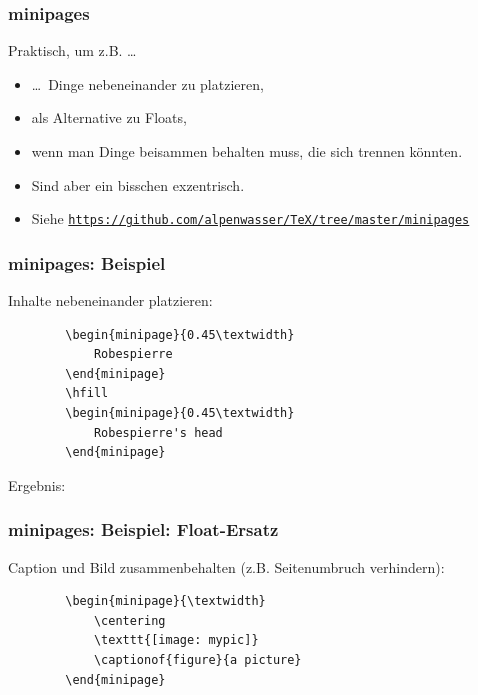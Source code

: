 \documentclass{beamer}                %
\begin{document}
\begin{frame} %
    \frametitle{minipages}

    Praktisch, um z.B. \ldots
    \begin{itemize}
        \item
            \ldots\ Dinge nebeneinander zu platzieren,
        \item
            als Alternative zu Floats,
        \item
            wenn man Dinge beisammen behalten muss, die sich trennen k\"onnten.
        \item
            Sind aber ein bisschen exzentrisch.
        \item
            Siehe
            \href{https://github.com/alpenwasser/TeX/tree/master/minipages}
                 {\nolinkurl{https://github.com/alpenwasser/TeX/tree/master/minipages}}
    \end{itemize}
\end{frame}
\begin{frame}[fragile] %
    \frametitle{minipages: Beispiel}

    Inhalte nebeneinander platzieren:

    \begin{verbatim}
        \begin{minipage}{0.45\textwidth}
            Robespierre
        \end{minipage}
        \hfill
        \begin{minipage}{0.45\textwidth}
            Robespierre's head
        \end{minipage}
    \end{verbatim}

    Ergebnis:

    \hfill
\end{frame}
\begin{frame}[fragile] %
    \frametitle{minipages: Beispiel: Float-Ersatz}

    Caption und Bild zusammenbehalten (z.B. Seitenumbruch verhindern):

    \begin{verbatim}
        \begin{minipage}{\textwidth}
            \centering
            \texttt{[image: mypic]}
            \captionof{figure}{a picture}
        \end{minipage}
    \end{verbatim}

\end{frame}
\end{document}
